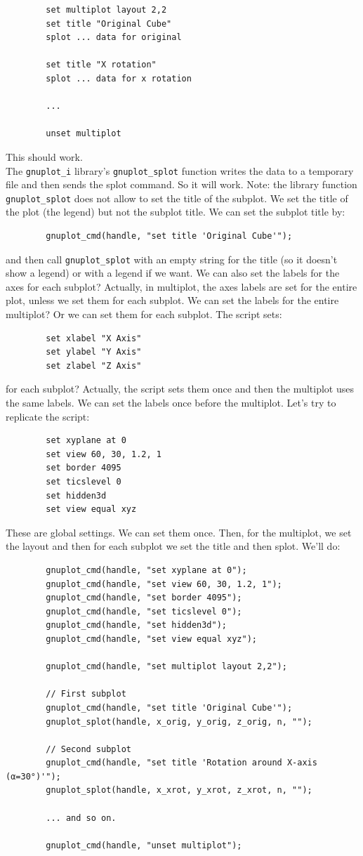 \documentclass[a4paper,10pt]{article}
\begin{document}
\begin{verbatim}
        set multiplot layout 2,2
        set title "Original Cube"
        splot ... data for original

        set title "X rotation"
        splot ... data for x rotation

        ...

        unset multiplot
\end{verbatim}
This should work.\\
The \verb|gnuplot_i| library's \verb|gnuplot_splot| function writes the data to a temporary file and then sends the splot command. So it will work.
Note: the library function \verb|gnuplot_splot| does not allow to set the title of the subplot. We set the title of the plot (the legend) but not the subplot title.
We can set the subplot title by:
\begin{verbatim}
        gnuplot_cmd(handle, "set title 'Original Cube'");
\end{verbatim}
and then call \verb|gnuplot_splot| with an empty string for the title (so it doesn't show a legend) or with a legend if we want.
We can also set the labels for the axes for each subplot? Actually, in multiplot, the axes labels are set for the entire plot, unless we set them for each subplot. We can set the labels for the entire multiplot? Or we can set them for each subplot.
The script sets:
\begin{verbatim}
        set xlabel "X Axis"
        set ylabel "Y Axis"
        set zlabel "Z Axis"
\end{verbatim}
for each subplot? Actually, the script sets them once and then the multiplot uses the same labels.
We can set the labels once before the multiplot.
Let's try to replicate the script:
\begin{verbatim}
        set xyplane at 0
        set view 60, 30, 1.2, 1
        set border 4095
        set ticslevel 0
        set hidden3d
        set view equal xyz
\end{verbatim}
These are global settings. We can set them once.
Then, for the multiplot, we set the layout and then for each subplot we set the title and then splot.
We'll do:
\begin{verbatim}
        gnuplot_cmd(handle, "set xyplane at 0");
        gnuplot_cmd(handle, "set view 60, 30, 1.2, 1");
        gnuplot_cmd(handle, "set border 4095");
        gnuplot_cmd(handle, "set ticslevel 0");
        gnuplot_cmd(handle, "set hidden3d");
        gnuplot_cmd(handle, "set view equal xyz");

        gnuplot_cmd(handle, "set multiplot layout 2,2");

        // First subplot
        gnuplot_cmd(handle, "set title 'Original Cube'");
        gnuplot_splot(handle, x_orig, y_orig, z_orig, n, "");

        // Second subplot
        gnuplot_cmd(handle, "set title 'Rotation around X-axis (α=30°)'");
        gnuplot_splot(handle, x_xrot, y_xrot, z_xrot, n, "");

        ... and so on.

        gnuplot_cmd(handle, "unset multiplot");
\end{verbatim}
\end{document}
